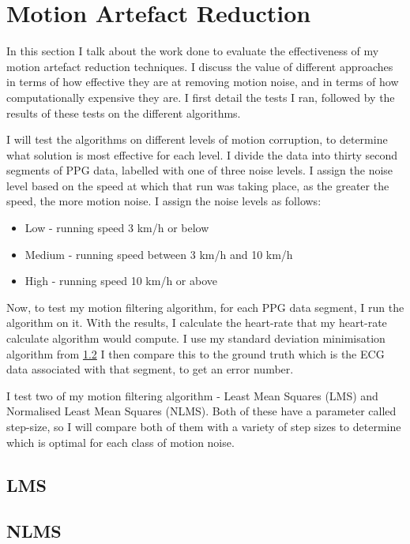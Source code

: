 \documentclass[12pt,a4paper,twoside,openright]{report}
\begin{document}
\section{Motion Artefact Reduction}

In this section I talk about the work done to evaluate the effectiveness of my
motion artefact reduction techniques. I discuss the value of different
approaches in terms of how effective they are at removing motion noise, and in
terms of how computationally expensive they are. I first detail the tests I
ran, followed by the results of these tests on the different algorithms.

I will test the algorithms on different levels of motion corruption, to
determine what solution is most effective for each level. I divide the
data into thirty second segments of PPG data, labelled with one of three
noise levels. I assign the noise level based on the speed at which that run
was taking place, as the greater the speed, the more motion noise. I assign
the noise levels as follows:

\begin{itemize}
	\item Low - running speed 3 km/h or below
	\item Medium - running speed between 3 km/h and 10 km/h
	\item High - running speed 10 km/h or above
\end{itemize} 

Now, to test my motion filtering algorithm, for each PPG data segment, I run
the algorithm on it. With the results, I calculate the heart-rate that my
heart-rate calculate algorithm would compute. 
I use my standard deviation minimisation algorithm from \ref{}
I then compare this to the
ground truth which is the ECG data associated with that segment, to get an
error number.

I test two of my motion filtering algorithm - Least Mean Squares (LMS) and Normalised Least Mean
Squares (NLMS). Both of these have a parameter called step-size, so I will
compare both of them with a variety of step sizes to determine which is
optimal for each class of motion noise.

\subsection{LMS}


\subsection{NLMS}
\end{document}
